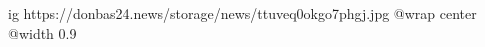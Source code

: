  
 
 
 
 

\ifcmt
  ig https://donbas24.news/storage/news/ttuveq0okgo7phgj.jpg
  @wrap center
  @width 0.9
\fi
